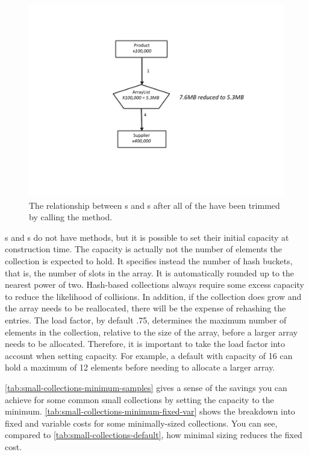 \begin{figure}
  \centering
 \includegraphics[width=.80\textwidth]{part1/Figures/collections/trimmed-product.pdf}
 \caption{The relationship between s and s after
 all of the
  have been trimmed by calling the  method.}
  \label{fig:trimmed-product}
\end{figure}
 
s and s do not have 
methods, but it is possible to set their initial capacity at construction time.
The capacity is actually not the number of elements the collection is
expected to hold. It specifies instead the number of hash buckets, that is, the
number of slots in the array. It is automatically rounded up to the
nearest power of two. Hash-based collections always require some excess capacity to reduce the
likelihood of collisions. In addition, if the collection does grow and the
array needs to be reallocated, there will be the expense of
rehashing the entries. The load factor, by default .75, determines the
maximum number of elements in the collection, relative to the size of the array,
before a larger array needs to be allocated. Therefore, it is important to take
the load factor into account when setting capacity. For example, a default
 with capacity of 16 can hold a maximum of 12 elements
before needing to allocate a larger array. 

\autoref{tab:small-collections-minimum-samples} gives a sense of the savings you can achieve
for some common small collections by setting the capacity to the minimum.
\autoref{tab:small-collections-minimum-fixed-var} shows the breakdown into fixed and variable costs for some
minimally-sized collections. You can see, compared to \autoref{tab:small-collections-default}, 
how minimal sizing reduces the fixed cost.

